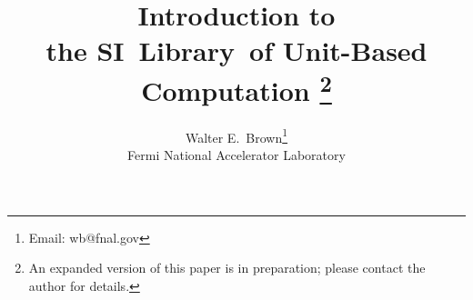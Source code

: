 



\flushbottom
\pagestyle{headings}

\setlength{\topmargin}{-0.5in}
\setlength{\textwidth}{5.5in}
\setlength{\oddsidemargin}{.5in}
\setlength{\evensidemargin}{.5in}
\setlength{\textheight}{9in}

\addtolength{\parskip}{2pt}

\setcounter{tocdepth}{1}

\renewcommand{\thefootnote}{}

\def\eg{{\it e.g.}}
\def\etal{{\it et al.}}
\def\etc{{\it etc.}}
\def\ie{{\it i.e.}}
\def\sic{{\it sic}}

\def \cpp{\leavevmode\hbox{C{\raise.15ex\hbox{+}}\kern-.05em{\raise.15ex\hbox{+}}}\ignorespaces}

\def \SIlib{{\sc SI~Library}}

\def \lib{{\sc Library}}






\title{ Introduction to\\the \SIlib\ of Unit-Based Computation
  \footnote{
  An expanded version of this paper is in preparation;
  please contact the author for details.}
}

\author{Walter E.\ Brown\thanks{Email: wb@fnal.gov}\\
  {\sc Fermi National Accelerator Laboratory}
}

